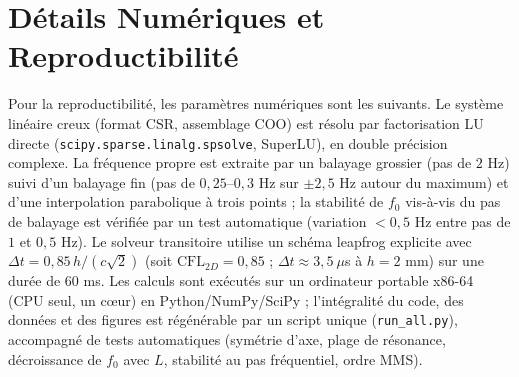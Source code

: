 \documentclass[11pt,a4paper,twocolumn]{article}
\begin{document}
\section{Détails Numériques et Reproductibilité}
\label{sec:repro}
Pour la reproductibilité, les paramètres numériques sont les suivants. Le système linéaire creux (format CSR, assemblage COO) est résolu par factorisation LU directe (\texttt{scipy.sparse.linalg.spsolve}, SuperLU), en double précision complexe. La fréquence propre est extraite par un balayage grossier (pas de $2$ Hz) suivi d'un balayage fin (pas de $0{,}25$–$0{,}3$ Hz sur $\pm2{,}5$ Hz autour du maximum) et d'une interpolation parabolique à trois points ; la stabilité de $f_0$ vis-à-vis du pas de balayage est vérifiée par un test automatique (variation $<0{,}5$ Hz entre pas de $1$ et $0{,}5$ Hz). Le solveur transitoire utilise un schéma leapfrog explicite avec $\Delta t = 0{,}85\,h/(c\sqrt{2})$ (soit $\mathrm{CFL}_{2D}=0{,}85$ ; $\Delta t \approx 3{,}5\ \mu$s à $h=2$ mm) sur une durée de $60$ ms. Les calculs sont exécutés sur un ordinateur portable x86-64 (CPU seul, un cœur) en Python/NumPy/SciPy ; l'intégralité du code, des données et des figures est régénérable par un script unique (\texttt{run\_all.py}), accompagné de tests automatiques (symétrie d'axe, plage de résonance, décroissance de $f_0$ avec $L$, stabilité au pas fréquentiel, ordre MMS).
\end{document}
